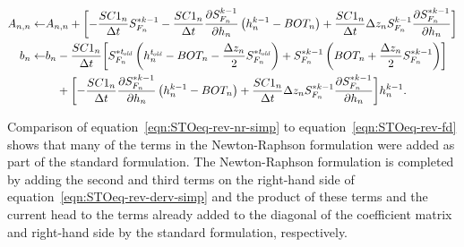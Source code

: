 \begin{equation}
	\label{eqn:STOeq-rev-nr-simp}
	\begin{split}
		A_{n,n} \leftarrow & A_{n,n} + \biggl[ -\frac{SC1_n}{\Delta t}  S_{F_n}^{\ast k-1} - \frac{SC1_n}{\Delta t} \frac{\partial S_{F_n}^{k-1}}{\partial h_n} \left( h_n^{k-1} - BOT_n \right) + \frac{SC1_n}{\Delta t} \Delta z_n S_{F_n}^{k-1}  \frac{\partial S_{F_n}^{\ast k-1}}{\partial h_n} \biggr]  \\
		b_n \leftarrow & b_n - \frac{SC1_n}{\Delta t} \biggl[ S_{F_n}^{\ast t_\mathit{\kern -0.07em old}} \left( h_n^{t_\mathit{\kern -0.07em old}} - BOT_n - \frac{\Delta z_n}{2} S_{F_n}^{\ast t_\mathit{\kern -0.07em old}} \right) + S_{F_n}^{\ast k-1} \left( BOT_n + \frac{\Delta z_n}{2} S_{F_n}^{\ast k-1} \right) \biggr] \\
		& \phantom{b_n} + \biggl[ - \frac{SC1_n}{\Delta t} \frac{\partial S_{F_n}^{\ast k-1}}{\partial h_n} \left( h_n^{k-1} - BOT_n \right) + \frac{SC1_n}{\Delta t} \Delta z_n S_{F_n}^{\ast k-1}  \frac{\partial S_{F_n}^{\ast k-1}}{\partial h_n} \biggr]  h_n^{k-1} .
	\end{split}
\end{equation} 

\noindent Comparison of equation~\ref{eqn:STOeq-rev-nr-simp} to equation~\ref{eqn:STOeq-rev-fd} shows that many of the terms in the Newton-Raphson formulation were added as part of the standard formulation. The Newton-Raphson formulation is completed by adding the second and third terms on the right-hand side of equation~\ref{eqn:STOeq-rev-derv-simp} and the product of these terms and the current head to the terms already added to the diagonal of the coefficient matrix and right-hand side by the standard formulation, respectively.
